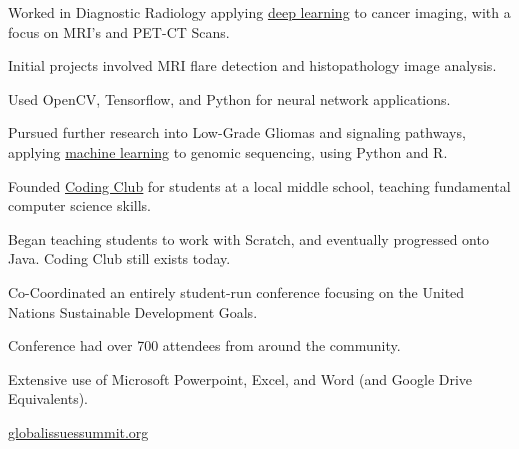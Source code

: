 \documentclass[]{deedy-resume-openfont}
\begin{document}
\begin{minipage}[t]{0.66\textwidth}
\begin{tightemize}
\item Worked in Diagnostic Radiology applying \underline{deep learning} to cancer imaging, with a focus on MRI's and PET-CT Scans.
\vspace{1 mm}
\item Initial projects involved MRI flare detection and histopathology image analysis.
\vspace{1 mm}
\item Used OpenCV, Tensorflow, and Python for neural network applications.
\vspace{1 mm}
\item Pursued further research into Low-Grade Gliomas and signaling pathways, applying \underline{machine learning} to genomic sequencing, using Python and R.
\end{tightemize}
\sectionsep
\vspace{2 mm}
\begin{tightemize}
\item Founded \underline{\href{https://goo.gl/KF7umR}{Coding Club}} for students at a local middle school, teaching fundamental computer science skills.
\vspace{1 mm}
\item Began teaching students to work with Scratch, and eventually progressed onto Java. Coding Club still exists today.
\end{tightemize}
\sectionsep
\vspace{2 mm}
\begin{tightemize}
\item Co-Coordinated an entirely student-run conference focusing on the United Nations Sustainable Development Goals.
\vspace{1 mm}
\item Conference had over 700 attendees from around the community.
\vspace{1 mm}
\item Extensive use of Microsoft Powerpoint, Excel, and Word (and Google Drive Equivalents).
\vspace{1 mm}
\item \url{globalissuessummit.org}
\end{tightemize}
\sectionsep


\end{minipage}
\end{document}
